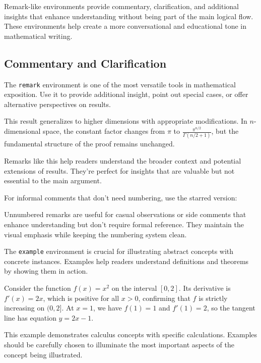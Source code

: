 \documentclass[9pt]{amsart}
\begin{document}
Remark-like environments provide commentary, clarification, and additional
insights that enhance understanding without being part of the main logical
flow. These environments help create a more conversational and educational tone
in mathematical writing.

\subsection{Commentary and Clarification}

The \texttt{remark} environment is one of the most versatile tools in
mathematical exposition. Use it to provide additional insight, point out
special cases, or offer alternative perspectives on results.

\begin{remark}
    This result generalizes to higher dimensions with appropriate modifications. In $n$-dimensional space, the constant factor changes from $\pi$ to $\frac{\pi^{n/2}}{\Gamma(n/2 + 1)}$, but the fundamental structure of the proof remains unchanged.
\end{remark}

Remarks like this help readers understand the broader context and potential
extensions of results. They're perfect for insights that are valuable but not
essential to the main argument.

For informal comments that don't need numbering, use the starred version:

\begin{remark*}
    Unnumbered remarks are useful for casual observations or side comments that enhance understanding but don't require formal reference. They maintain the visual emphasis while keeping the numbering system clean.
\end{remark*}

The \texttt{example} environment is crucial for illustrating abstract concepts
with concrete instances. Examples help readers understand definitions and
theorems by showing them in action.

\begin{example}
    Consider the function $f(x) = x^2$ on the interval $[0, 2]$. Its derivative is $f'(x) = 2x$, which is positive for all $x > 0$, confirming that $f$ is strictly increasing on $(0, 2]$. At $x = 1$, we have $f(1) = 1$ and $f'(1) = 2$, so the tangent line has equation $y = 2x - 1$.
\end{example}

This example demonstrates calculus concepts with specific calculations.
Examples should be carefully chosen to illuminate the most important aspects of
the concept being illustrated.
\end{document}

